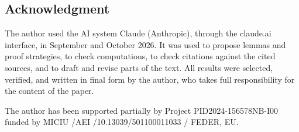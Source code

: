 \documentclass[leqno,10pt]{amsart}
\def\MR#1{}
\theoremstyle{definition}
\numberwithin{equation}{section}
\begin{document}
\subsection*{Acknowledgment}
The author used the AI system Claude (Anthropic), through the claude.ai interface, in September and October 2026. It was used to propose lemmas and proof strategies, to check computations, to check citations against the cited sources, and to draft and revise parts of the text. All results were selected, verified, and written in final form by the author, who takes full responsibility for the content of the paper.

The author has been supported partially by Project PID2024-156578NB-I00 funded by MICIU /AEI /10.13039/501100011033 / FEDER, EU.


\def\polhk#1{\setbox0=\hbox{#1}{\ooalign{\hidewidth
  \lower1.5ex\hbox{`}\hidewidth\crcr\unhbox0}}} \def\cprime{$'$}
  \def\cprime{$'$} \def\cprime{$'$}
  \def\polhk#1{\setbox0=\hbox{#1}{\ooalign{\hidewidth
  \lower1.5ex\hbox{`}\hidewidth\crcr\unhbox0}}} \def\cprime{$'$}
  \def\cprime{$'$} \def\cprime{$'$} \def\cprime{$'$}
  \def\polhk#1{\setbox0=\hbox{#1}{\ooalign{\hidewidth
  \lower1.5ex\hbox{`}\hidewidth\crcr\unhbox0}}} \def\cprime{$'$}
  \def\Dbar{\leavevmode\lower.6ex\hbox to 0pt{\hskip-.23ex \accent"16\hss}D}
  \def\cprime{$'$} \def\cprime{$'$} \def\cprime{$'$} \def\cprime{$'$}
  \def\cprime{$'$} \def\cprime{$'$} \def\cprime{$'$} \def\cprime{$'$}
  \def\cprime{$'$} \def\cprime{$'$} \def\cprime{$'$} \def\dbar{\leavevmode\hbox
  to 0pt{\hskip.2ex \accent"16\hss}d} \def\cprime{$'$} \def\cprime{$'$}
  \def\cprime{$'$} \def\cprime{$'$} \def\cprime{$'$} \def\cprime{$'$}
  \def\cprime{$'$} \def\cprime{$'$} \def\cprime{$'$} \def\cprime{$'$}
  \def\cprime{$'$} \def\cprime{$'$} \def\cprime{$'$} \def\cprime{$'$}
  \def\cprime{$'$} \def\cprime{$'$} \def\cprime{$'$} \def\cprime{$'$}
  \def\cprime{$'$} \def\cprime{$'$} \def\cprime{$'$} \def\cprime{$'$}
  \def\cprime{$'$} \def\cprime{$'$} \def\cprime{$'$} \def\cprime{$'$}
  \def\cprime{$'$} \def\cprime{$'$} \def\cprime{$'$} \def\cprime{$'$}
  \def\cprime{$'$} \def\cprime{$'$}
\providecommand{\bysame}{\leavevmode\hbox to3em{\hrulefill}\thinspace}
\providecommand{\MR}{\relax\ifhmode\unskip\space\fi MR }
\providecommand{\MRhref}[2]{%
  \href{http://www.ams.org/mathscinet-getitem?mr=#1}{#2}
}
\providecommand{\href}[2]{#2}
\end{document}
